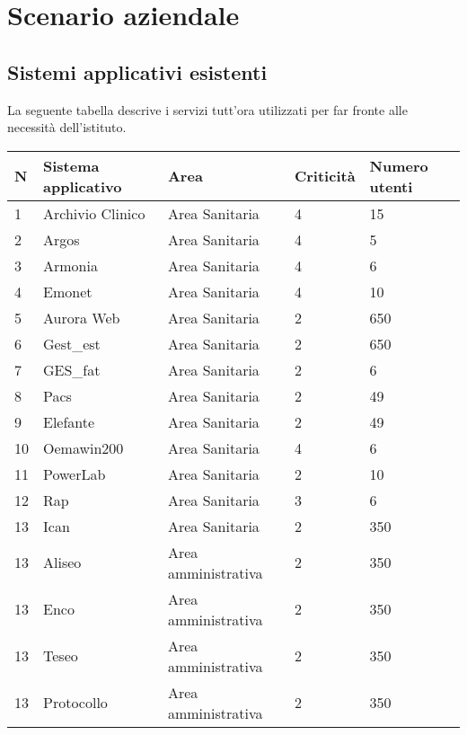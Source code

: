 \newpage

\section{Scenario aziendale}

	\subsection{Sistemi applicativi esistenti}
	La seguente tabella descrive i servizi tutt’ora utilizzati per far fronte alle necessità dell’istituto.
	\begin{table}[h]
		\begin{tabular}{|l|l|l|l|l|}
			\hline
			\rowcolor[HTML]{EFEFEF} 
			\textbf{N} & \textbf{Sistema applicativo} & \textbf{Area} & \textbf{Criticità} & \textbf{Numero utenti} \\ \hline
			1  & Archivio Clinico		& Area Sanitaria 			& 4		& 15		\\ \hline
			2  & Argos						& Area Sanitaria			& 4		& 5		\\ \hline
			3  & Armonia				& Area Sanitaria			& 4		& 6		\\ \hline
			4  & Emonet					& Area Sanitaria			& 4		& 10		\\ \hline
			5  & Aurora Web			& Area Sanitaria			& 2		& 650		\\ \hline
			6  & Gest\_est				& Area Sanitaria			& 2		& 650		\\ \hline
			7  & GES\_fat				& Area Sanitaria			& 2		& 6		\\ \hline
			8  & Pacs						& Area Sanitaria			& 2		& 49		\\ \hline
			9  & Elefante					& Area Sanitaria			& 2		& 49		\\ \hline
			10  & Oemawin200		& Area Sanitaria			& 4		& 6		\\ \hline
			11  & PowerLab				& Area Sanitaria			& 2		& 10		\\ \hline
			12  & Rap						& Area Sanitaria			& 3		& 6		\\ \hline
			13  & Ican						& Area Sanitaria			& 2		& 350 	\\ \hline
			13  & Aliseo					& Area amministrativa			& 2		& 350 	\\ \hline
			13  & Enco						& Area amministrativa			& 2		& 350 	\\ \hline
			13  & Teseo						& Area amministrativa			& 2		& 350 	\\ \hline
			13  & Protocollo			& Area amministrativa			& 2		& 350 	\\ \hline

		\end{tabular}
	\end{table}


